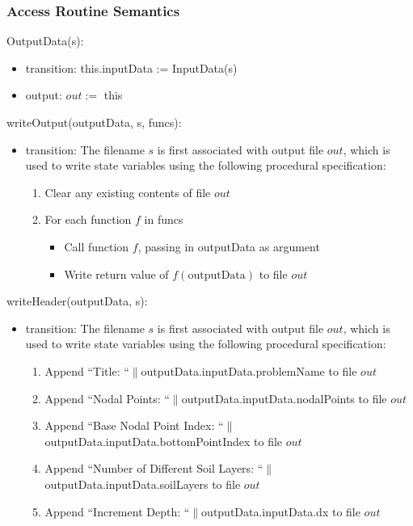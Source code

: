 \documentclass[12pt, titlepage]{article}
\begin{document}
\subsubsection{Access Routine Semantics}

\noindent OutputData(s):
\begin{itemize}
\item transition: this.inputData := InputData(s)
\item output: $out :=  $ this
\end{itemize}

\noindent writeOutput(outputData, s, funcs):
\begin{itemize}
\item transition: The filename $s$ is first associated with output file $out$, which is
used to write state variables using the following procedural specification:
  \begin{enumerate}
    \item Clear any existing contents of file $out$
    \item For each function $f$ in funcs
      \begin{itemize}
        \item Call function $f$, passing in outputData as argument
        \item Write return value of $f(\text{outputData})$ to file $out$
      \end{itemize}
  \end{enumerate}
\end{itemize}

\noindent writeHeader(outputData, s):
\begin{itemize}
  \item transition: The filename $s$ is first associated with output file $out$, which is
  used to write state variables using the following procedural specification:
    \begin{enumerate}
      \item Append “Title: “$\|$outputData.inputData.problemName to file $out$
      \item Append “Nodal Points: “$\|$outputData.inputData.nodalPoints to file $out$
      \item Append “Base Nodal Point Index: “$\|$outputData.inputData.bottomPointIndex to file $out$
      \item Append “Number of Different Soil Layers: “$\|$outputData.inputData.soilLayers to file $out$
      \item Append “Increment Depth: “$\|$outputData.inputData.dx to file $out$
    \end{enumerate}
  \end{itemize}
\end{document}
